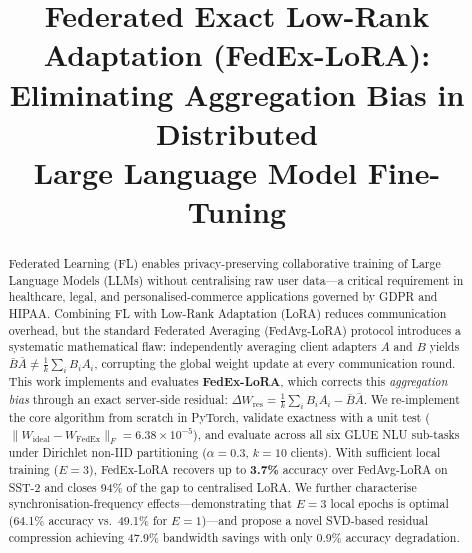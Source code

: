 \documentclass[conference]{IEEEtran}
\begin{document}
\title{Federated Exact Low-Rank Adaptation (FedEx-LoRA):\\
Eliminating Aggregation Bias in Distributed\\
Large Language Model Fine-Tuning}

\author{
\and
{}
}

\maketitle

\begin{abstract}
Federated Learning (FL) enables privacy-preserving collaborative training of
Large Language Models (LLMs) without centralising raw user data—a critical
requirement in healthcare, legal, and personalised-commerce applications
governed by GDPR and HIPAA. Combining FL with Low-Rank Adaptation (LoRA)
reduces communication overhead, but the standard Federated Averaging
(FedAvg-LoRA) protocol introduces a systematic mathematical flaw: independently
averaging client adapters $A$ and $B$ yields $\bar{B}\bar{A} \neq
\frac{1}{k}\sum_i B_i A_i$, corrupting the global weight update at every
communication round. This work implements and evaluates \textbf{FedEx-LoRA},
which corrects this \emph{aggregation bias} through an exact server-side
residual: $\Delta W_{\mathrm{res}} = \frac{1}{k}\sum_i B_i A_i -
\bar{B}\bar{A}$. We re-implement the core algorithm from scratch in PyTorch,
validate exactness with a unit test ($\|W_{\mathrm{ideal}} -
W_{\mathrm{FedEx}}\|_F = 6.38\times10^{-5}$), and evaluate across all six GLUE
NLU sub-tasks under Dirichlet non-IID partitioning ($\alpha{=}0.3$,
$k{=}10$ clients). With sufficient local training ($E{=}3$), FedEx-LoRA
recovers up to \textbf{3.7\%} accuracy over FedAvg-LoRA on SST-2 and closes
94\% of the gap to centralised LoRA. We further characterise
synchronisation-frequency effects---demonstrating that $E{=}3$ local epochs
is optimal (64.1\% accuracy vs.\ 49.1\% for $E{=}1$)---and propose a novel
SVD-based residual compression achieving 47.9\% bandwidth savings with only
0.9\% accuracy degradation.
\end{abstract}
\end{document}
